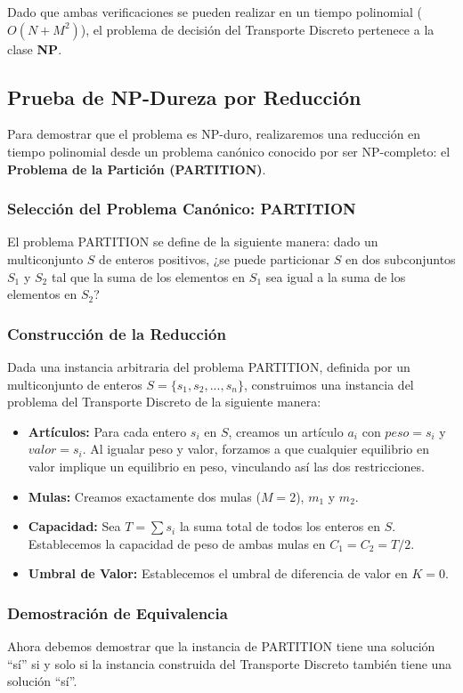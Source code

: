 \documentclass[12pt, a4paper]{article}
\begin{document}
    Dado que ambas verificaciones se pueden realizar en un tiempo polinomial ($O(N + M^2)$), el problema de decisión del Transporte Discreto pertenece a la clase \textbf{NP}.

    \subsection{Prueba de NP-Dureza por Reducción}
    Para demostrar que el problema es NP-duro, realizaremos una reducción en tiempo polinomial desde un problema canónico conocido por ser NP-completo: el \textbf{Problema de la Partición (PARTITION)}.

    \subsubsection{Selección del Problema Canónico: PARTITION}
    El problema PARTITION se define de la siguiente manera: dado un multiconjunto $S$ de enteros positivos, ¿se puede particionar $S$ en dos subconjuntos $S_1$ y $S_2$ tal que la suma de los elementos en $S_1$ sea igual a la suma de los elementos en $S_2$?

    \subsubsection{Construcción de la Reducción}
    Dada una instancia arbitraria del problema PARTITION, definida por un multiconjunto de enteros $S = \{s_1, s_2, ..., s_n\}$, construimos una instancia del problema del Transporte Discreto de la siguiente manera:

    \begin{itemize}
        \item \textbf{Artículos:} Para cada entero $s_i$ en $S$, creamos un artículo $a_i$ con $peso = s_i$ y $valor = s_i$. Al igualar peso y valor, forzamos a que cualquier equilibrio en valor implique un equilibrio en peso, vinculando así las dos restricciones.
        \item \textbf{Mulas:} Creamos exactamente dos mulas ($M = 2$), $m_1$ y $m_2$.
        \item \textbf{Capacidad:} Sea $T = \sum s_i$ la suma total de todos los enteros en $S$. Establecemos la capacidad de peso de ambas mulas en $C_1 = C_2 = T/2$.
        \item \textbf{Umbral de Valor:} Establecemos el umbral de diferencia de valor en $K = 0$.
    \end{itemize}

    \subsubsection{Demostración de Equivalencia}
    Ahora debemos demostrar que la instancia de PARTITION tiene una solución ``sí'' si y solo si la instancia construida del Transporte Discreto también tiene una solución ``sí''.
\end{document}
